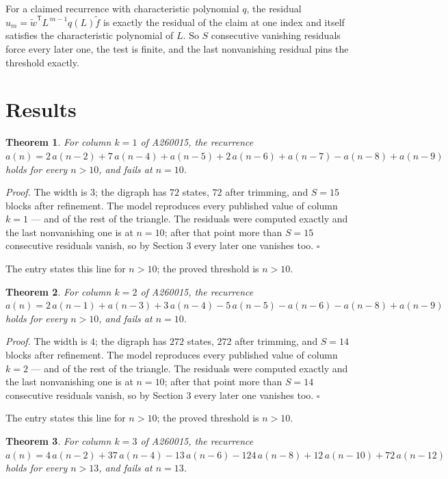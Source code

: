 \documentclass[11pt]{article}
\newtheorem{theorem}{Theorem}
\theoremstyle{definition}
\begin{document}
For a claimed recurrence with characteristic polynomial $q$, the residual $u_m = \tilde w^{\mathsf T}L^{\,m-1}q(L)\tilde f$ is exactly the residual of the claim at one index and itself satisfies the characteristic polynomial of $L$. So $S$ consecutive vanishing residuals force every later one, the test is finite, and the last nonvanishing residual pins the threshold exactly.

\section{Results}

\begin{theorem} For column $k = 1$ of A260015, the recurrence $a(n) = 2\,a(n-2) + 7\,a(n-4) + a(n-5) + 2\,a(n-6) + a(n-7) - a(n-8) + a(n-9)$ holds for every $n > 10$, and fails at $n = 10$.\end{theorem}

{\itshape Proof.} The width is $3$; the digraph has $72$ states, $72$ after trimming, and $S = 15$ blocks after refinement. The model reproduces every published value of column $k = 1$ --- and of the rest of the triangle. The residuals were computed exactly and the last nonvanishing one is at $n = 10$; after that point more than $S = 15$ consecutive residuals vanish, so by Section 3 every later one vanishes too. $\square$

The entry states this line for $n > 10$; the proved threshold is $n > 10$.

\begin{theorem} For column $k = 2$ of A260015, the recurrence $a(n) = 2\,a(n-1) + a(n-3) + 3\,a(n-4) - 5\,a(n-5) - a(n-6) - a(n-8) + a(n-9)$ holds for every $n > 10$, and fails at $n = 10$.\end{theorem}

{\itshape Proof.} The width is $4$; the digraph has $272$ states, $272$ after trimming, and $S = 14$ blocks after refinement. The model reproduces every published value of column $k = 2$ --- and of the rest of the triangle. The residuals were computed exactly and the last nonvanishing one is at $n = 10$; after that point more than $S = 14$ consecutive residuals vanish, so by Section 3 every later one vanishes too. $\square$

The entry states this line for $n > 10$; the proved threshold is $n > 10$.

\begin{theorem} For column $k = 3$ of A260015, the recurrence $a(n) = 4\,a(n-2) + 37\,a(n-4) - 13\,a(n-6) - 124\,a(n-8) + 12\,a(n-10) + 72\,a(n-12)$ holds for every $n > 13$, and fails at $n = 13$.\end{theorem}
\end{document}

